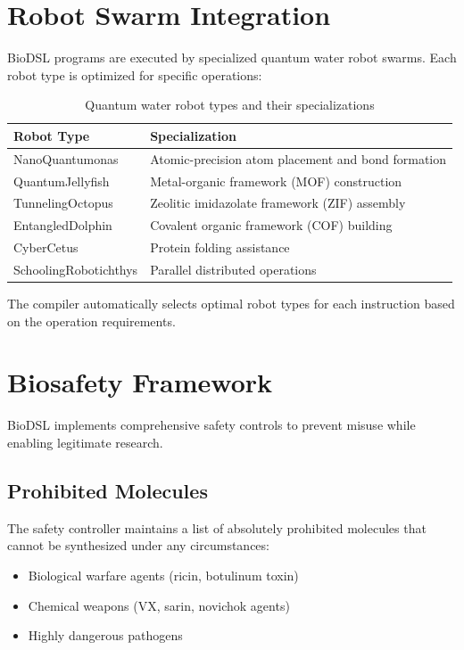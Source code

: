 \documentclass[12pt,a4paper]{article}
\begin{document}
\section{Robot Swarm Integration}

BioDSL programs are executed by specialized quantum water robot swarms. Each robot type is optimized for specific operations:

\begin{table}[H]
\centering
\begin{tabular}{lp{7cm}}
\toprule
\textbf{Robot Type} & \textbf{Specialization} \\
\midrule
NanoQuantumonas & Atomic-precision atom placement and bond formation \\
QuantumJellyfish & Metal-organic framework (MOF) construction \\
TunnelingOctopus & Zeolitic imidazolate framework (ZIF) assembly \\
EntangledDolphin & Covalent organic framework (COF) building \\
CyberCetus & Protein folding assistance \\
SchoolingRobotichthys & Parallel distributed operations \\
\bottomrule
\end{tabular}
\caption{Quantum water robot types and their specializations}
\end{table}

The compiler automatically selects optimal robot types for each instruction based on the operation requirements.

\section{Biosafety Framework}

BioDSL implements comprehensive safety controls to prevent misuse while enabling legitimate research.

\subsection{Prohibited Molecules}

The safety controller maintains a list of absolutely prohibited molecules that cannot be synthesized under any circumstances:

\begin{itemize}
    \item Biological warfare agents (ricin, botulinum toxin)
    \item Chemical weapons (VX, sarin, novichok agents)
    \item Highly dangerous pathogens
\end{itemize}
\end{document}
